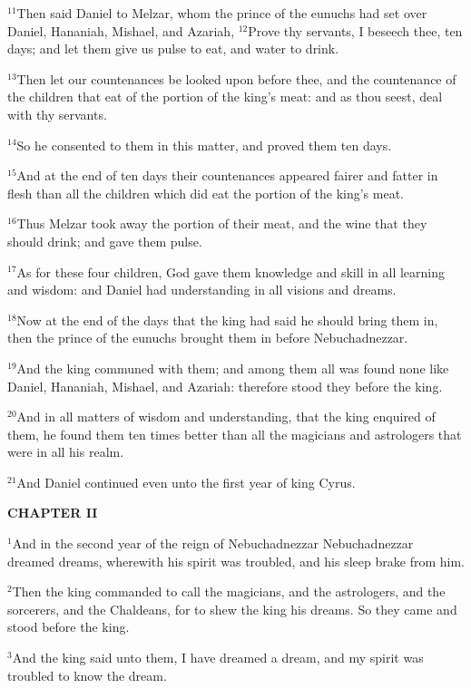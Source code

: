 \documentclass[12pt]{article}
\begin{document}
$^{11}$Then said Daniel to Melzar, whom the prince of the eunuchs had
set over Daniel, Hananiah, Mishael, and Azariah, $^{12}$Prove thy
servants, I beseech thee, ten days; and let them give us pulse to eat,
and water to drink.


$^{13}$Then let our countenances be looked upon before thee, and the
countenance of the children that eat of the portion of the king's
meat: and as thou seest, deal with thy servants.


$^{14}$So he consented to them in this matter, and proved them ten days.

$^{15}$And at the end of ten days their countenances appeared fairer and
fatter in flesh than all the children which did eat the portion of the
king's meat.


$^{16}$Thus Melzar took away the portion of their meat, and the wine
that they should drink; and gave them pulse.


$^{17}$As for these four children, God gave them knowledge and skill in
all learning and wisdom: and Daniel had understanding in all visions
and dreams.


$^{18}$Now at the end of the days that the king had said he should bring
them in, then the prince of the eunuchs brought them in before
Nebuchadnezzar.


$^{19}$And the king communed with them; and among them all was found
none like Daniel, Hananiah, Mishael, and Azariah: therefore stood they
before the king.


$^{20}$And in all matters of wisdom and understanding, that the king
enquired of them, he found them ten times better than all the
magicians and astrologers that were in all his realm.


$^{21}$And Daniel continued even unto the first year of king Cyrus.




\begin{center}
\textbf{\small CHAPTER II}
\end{center}
$^{1}$And in the second year of the reign of Nebuchadnezzar
Nebuchadnezzar dreamed dreams, wherewith his spirit was troubled, and
his sleep brake from him.


$^{2}$Then the king commanded to call the magicians, and the
astrologers, and the sorcerers, and the Chaldeans, for to shew the
king his dreams. So they came and stood before the king.


$^{3}$And the king said unto them, I have dreamed a dream, and my spirit
was troubled to know the dream.
\end{document}
